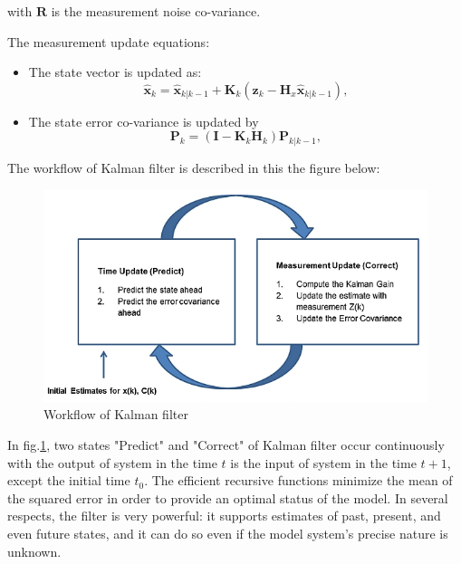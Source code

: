 with $\textbf{R}$ is the measurement noise co-variance.\par
The measurement update equations:
\begin{itemize}
    \item The state vector is updated as:
        \begin{equation}
                      \hat{\textbf{x}}_k = \hat{\textbf{x}}_{k|k-1} + \textbf{K}_k(\textbf{z}_k - \textbf{H}_x\hat{\textbf{x}}_{k|k-1}), 
        \end{equation}
    \item The state error co-variance is updated by
        \begin{equation}
                      \textbf{P}_k = (\textbf{I} -  \textbf{K}_k\textbf{H}_k)\textbf{P}_{k|k-1}, 
        \end{equation}
\end{itemize}
\pagebreak
\hspace{0.5cm}The workflow of Kalman filter is described in this the figure below:
\begin{figure}[h!]
    \centering
    \includegraphics[scale=0.7]{Chapters/Fig/kal_dig_2.png}
    \caption{Workflow of Kalman filter}
    \label{fig:kalman_wf}
\end{figure}
\par
In fig.\ref{fig:kalman_wf}, two states "Predict" and "Correct" of Kalman filter occur continuously with the output of system in the time $t$ is the input of system in the time $t+1$, except the initial time $t_0$. The efficient recursive functions minimize the mean of the squared error in order to provide an optimal status of the model. In several respects, the filter is very powerful: it supports estimates of past, present, and even future states, and it can do so even if the model system's precise nature is unknown.






